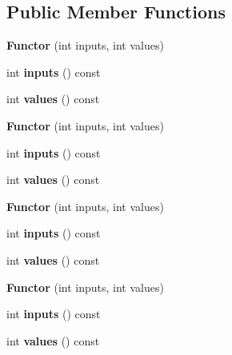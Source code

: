 \subsection*{Public Member Functions}
\begin{DoxyCompactItemize}
\item 
\mbox{\label{struct_functor_ada6edcd519e01af4db5524432104af5b}} 
{\bfseries Functor} (int inputs, int values)
\item 
\mbox{\label{struct_functor_a98d1cf500f408428413a688f072b93ed}} 
int {\bfseries inputs} () const
\item 
\mbox{\label{struct_functor_af869ac9e668e12e78a7e82a219263e31}} 
int {\bfseries values} () const
\item 
\mbox{\label{struct_functor_ada6edcd519e01af4db5524432104af5b}} 
{\bfseries Functor} (int inputs, int values)
\item 
\mbox{\label{struct_functor_a98d1cf500f408428413a688f072b93ed}} 
int {\bfseries inputs} () const
\item 
\mbox{\label{struct_functor_af869ac9e668e12e78a7e82a219263e31}} 
int {\bfseries values} () const
\item 
\mbox{\label{struct_functor_ada6edcd519e01af4db5524432104af5b}} 
{\bfseries Functor} (int inputs, int values)
\item 
\mbox{\label{struct_functor_a98d1cf500f408428413a688f072b93ed}} 
int {\bfseries inputs} () const
\item 
\mbox{\label{struct_functor_af869ac9e668e12e78a7e82a219263e31}} 
int {\bfseries values} () const
\item 
\mbox{\label{struct_functor_ada6edcd519e01af4db5524432104af5b}} 
{\bfseries Functor} (int inputs, int values)
\item 
\mbox{\label{struct_functor_a98d1cf500f408428413a688f072b93ed}} 
int {\bfseries inputs} () const
\item 
\mbox{\label{struct_functor_af869ac9e668e12e78a7e82a219263e31}} 
int {\bfseries values} () const
\end{DoxyCompactItemize}
